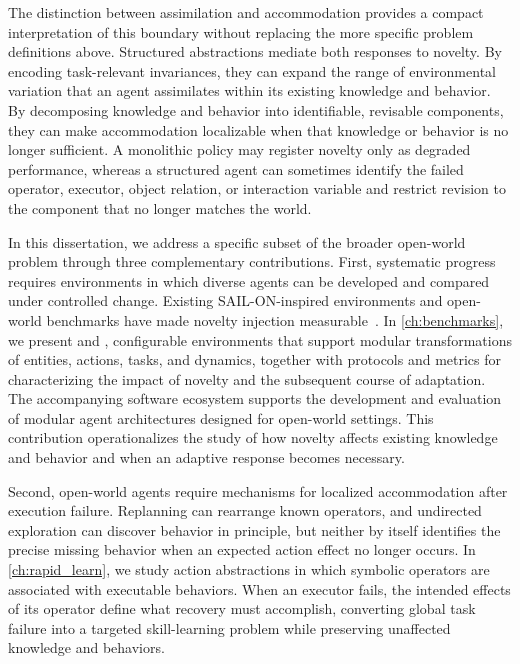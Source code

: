 The distinction between assimilation and accommodation provides a compact interpretation of this boundary without replacing the more specific problem definitions above.
Structured abstractions mediate both responses to novelty.
By encoding task-relevant invariances, they can expand the range of environmental variation that an agent assimilates within its existing knowledge and behavior.
By decomposing knowledge and behavior into identifiable, revisable components, they can make accommodation localizable when that knowledge or behavior is no longer sufficient.
A monolithic policy may register novelty only as degraded performance, whereas a structured agent can sometimes identify the failed operator, executor, object relation, or interaction variable and restrict revision to the component that no longer matches the world.

In this dissertation, we address a specific subset of the broader open-world problem through three complementary contributions.
First, systematic progress requires environments in which diverse agents can be developed and compared under controlled change.
Existing SAIL-ON-inspired environments and open-world benchmarks have made novelty injection measurable~\citep{senator2019science,holder2025introduction,balloch2022novgrid,goss2023polycraft,feeney2022novelcraft}.
In \cref{ch:benchmarks}, we present \NovelGridworlds{} and \NovelGym{}, configurable environments that support modular transformations of entities, actions, tasks, and dynamics, together with protocols and metrics for characterizing the impact of novelty and the subsequent course of adaptation.
The accompanying software ecosystem supports the development and evaluation of modular agent architectures designed for open-world settings.
This contribution operationalizes the study of how novelty affects existing knowledge and behavior and when an adaptive response becomes necessary.

Second, open-world agents require mechanisms for localized accommodation after execution failure.
Replanning can rearrange known operators, and undirected exploration can discover behavior in principle, but neither by itself identifies the precise missing behavior when an expected action effect no longer occurs.
In \cref{ch:rapid_learn}, we study action abstractions in which symbolic operators are associated with executable behaviors.
When an executor fails, the intended effects of its operator define what recovery must accomplish, converting global task failure into a targeted skill-learning problem while preserving unaffected knowledge and behaviors.

